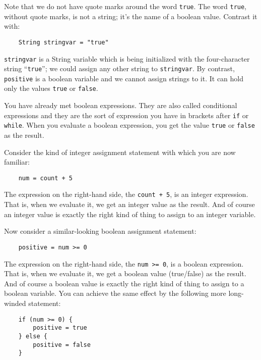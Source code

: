Note that we do not have quote marks around the word \texttt{true}.  
The word \texttt{true}, without quote marks, is not a string; it's the name of a
boolean value.  Contrast it with:

\begin{Verbatim}
    String stringvar = "true"
\end{Verbatim}

\texttt{stringvar} is a String variable which is being initialized
with the four-character string ``\texttt{true}''; we could assign any
other string to \texttt{stringvar}. By contrast, \texttt{positive}
is a boolean variable and we cannot assign strings to it.
It can hold only the values \texttt{true} or \texttt{false}.

You have already met boolean expressions.  They are also called conditional
expressions and they are the sort of expression you have in brackets
after \texttt{if} or \texttt{while}.  When you evaluate a boolean expression,
you get the value \texttt{true} or \texttt{false} as the result.

Consider the kind of integer assignment statement with which you are
now familiar:

\begin{Verbatim}
    num = count + 5
\end{Verbatim}

The expression on the right-hand side, the \texttt{count + 5}, is an
integer expression.  That is, when we evaluate it, we get an integer value
as the result.  And of course an integer value is exactly the right kind of
thing to assign to an integer variable.

Now consider a similar-looking boolean assignment statement:

\begin{Verbatim}
    positive = num >= 0
\end{Verbatim}

The expression on the right-hand side, the \texttt{num >= 0}, is a
boolean expression.  That is, when we evaluate it, we get a boolean value
(true/false) as the result.  And of course a boolean value is exactly the
right kind of thing to assign to a boolean variable.  You can achieve
the same effect by the following more long-winded statement:

\begin{Verbatim}
    if (num >= 0) {
        positive = true
    } else {
        positive = false
    }
\end{Verbatim}

